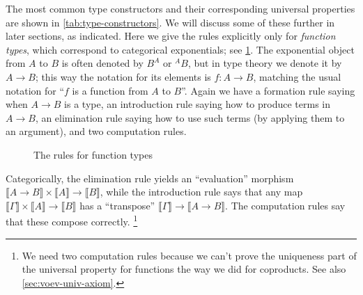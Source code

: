 \documentclass[10pt]{article}
\let\jdeq\equiv
\def\ty{\;\mathsf{type}}
\def\m#1{\llbracket#1\rrbracket}
\def\types{\vdash}
\def\equiv{\mathsf{Equiv}}
\numberwithin{equation}{section}
\begin{document}
The most common type constructors and their corresponding universal properties are shown in \cref{tab:type-constructors}.
We will discuss some of these further in later sections, as indicated.
Here we give the rules explicitly only for \emph{function types}, which correspond to categorical exponentials; see \cref{fig:function-types}.
The exponential object from $A$ to $B$ is often denoted by $B^A$ or ${}^A B$, but in type theory we denote it by $A\to B$; this way the notation for its elements is $f:A\to B$, matching the usual notation for ``$f$ is a function from $A$ to $B$''.
Again we have a formation rule saying when $A\to B$ is a type, an introduction rule saying how to produce terms in $A\to B$, an elimination rule saying how to use such terms (by applying them to an argument), and two computation rules.
\begin{figure}
  \centering
\caption{The rules for function types}
\label{fig:function-types}
\end{figure}
Categorically, the elimination rule yields %
an ``evaluation'' morphism $\m{A\to B} \times \m A \to \m B$, while the introduction rule says that any map $\m \Gamma \times \m A \to \m B$ has a ``transpose'' $\m \Gamma \to \m{A\to B}$.
The computation rules say that these compose correctly.%
\footnote{We need two computation rules because we can't prove the uniqueness part of the universal property for functions the way we did for coproducts.
  See also
  \cref{sec:voev-univ-axiom}.}
\end{document}
